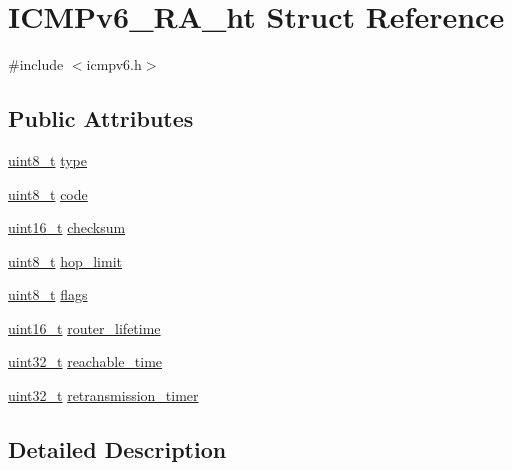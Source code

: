 \hypertarget{struct_i_c_m_pv6___r_a__ht}{}\section{I\+C\+M\+Pv6\+\_\+\+R\+A\+\_\+ht Struct Reference}
\label{struct_i_c_m_pv6___r_a__ht}


{\ttfamily \#include $<$icmpv6.\+h$>$}

\subsection*{Public Attributes}
\begin{DoxyCompactItemize}
\item 
\hyperlink{_p_e___types_8h_aba7bc1797add20fe3efdf37ced1182c5}{uint8\+\_\+t} \hyperlink{struct_i_c_m_pv6___r_a__ht_a479c4667272b1ce11fd5692e4cb8af6d}{type}
\item 
\hyperlink{_p_e___types_8h_aba7bc1797add20fe3efdf37ced1182c5}{uint8\+\_\+t} \hyperlink{struct_i_c_m_pv6___r_a__ht_adcc6b0b601d32fc1b8e97356bcfff4f3}{code}
\item 
\hyperlink{_p_e___types_8h_a1f1825b69244eb3ad2c7165ddc99c956}{uint16\+\_\+t} \hyperlink{struct_i_c_m_pv6___r_a__ht_aa60666da952a52f10c215afc2c9dae6d}{checksum}
\item 
\hyperlink{_p_e___types_8h_aba7bc1797add20fe3efdf37ced1182c5}{uint8\+\_\+t} \hyperlink{struct_i_c_m_pv6___r_a__ht_aa2e454de73063c96bd5cd848c5fe3298}{hop\+\_\+limit}
\item 
\hyperlink{_p_e___types_8h_aba7bc1797add20fe3efdf37ced1182c5}{uint8\+\_\+t} \hyperlink{struct_i_c_m_pv6___r_a__ht_abf0481d954644b89c6522dc1e486282b}{flags}
\item 
\hyperlink{_p_e___types_8h_a1f1825b69244eb3ad2c7165ddc99c956}{uint16\+\_\+t} \hyperlink{struct_i_c_m_pv6___r_a__ht_a659272500ba7f102f26ed2485aa72adc}{router\+\_\+lifetime}
\item 
\hyperlink{_p_e___types_8h_a33594304e786b158f3fb30289278f5af}{uint32\+\_\+t} \hyperlink{struct_i_c_m_pv6___r_a__ht_a1697156513573cabd33a230b23d60950}{reachable\+\_\+time}
\item 
\hyperlink{_p_e___types_8h_a33594304e786b158f3fb30289278f5af}{uint32\+\_\+t} \hyperlink{struct_i_c_m_pv6___r_a__ht_a71ddac3f10ce157b7dedb7cc3ddf3e0e}{retransmission\+\_\+timer}
\end{DoxyCompactItemize}


\subsection{Detailed Description}


